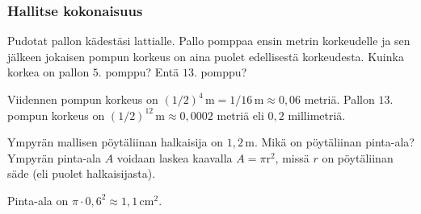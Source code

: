 \begin{tehtavasivu}

\subsubsection*{Hallitse kokonaisuus}

\begin{tehtava}
        Pudotat pallon kädestäsi lattialle. Pallo pomppaa ensin metrin korkeudelle ja sen jälkeen jokaisen pompun korkeus on aina puolet edellisestä korkeudesta. Kuinka korkea on pallon $5$. pomppu? Entä $13$. pomppu?     
        \begin{vastaus}
        Viidennen pompun korkeus on $(1/2)^4\,\textrm{m}=1/16\,\textrm{m}\approx 0,06$ metriä. Pallon $13$. pompun korkeus on $(1/2)^{12}\,\textrm{m} \approx 0,0002$ metriä eli $0,2$ millimetriä.
        \end{vastaus}
\end{tehtava}

\begin{tehtava}
        Ympyrän mallisen pöytäliinan halkaisija on $1,2$\,m.  Mikä on pöytäliinan pinta-ala? Ympyrän pinta-ala $A$ voidaan laskea kaavalla $A=\pi\text{r}^2$, missä $r$ on pöytäliinan säde (eli puolet halkaisijasta).
        \begin{vastaus}
        Pinta-ala on $\pi \cdot 0,6^2 \approx 1,1\,$cm$^2$.
        \end{vastaus}
\end{tehtava}


\end{tehtavasivu}
